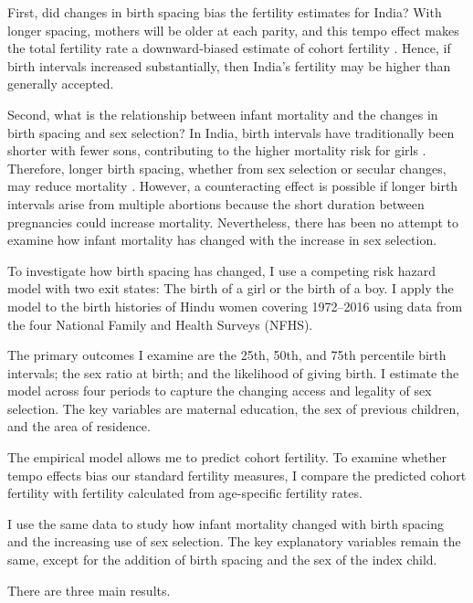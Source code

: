 \documentclass[12pt,letterpaper]{article}
\begin{document}
First, did changes in birth spacing bias the fertility estimates for India? 
With longer spacing, mothers will be older at each parity, and this tempo effect makes the 
total fertility rate a downward-biased estimate of cohort fertility
\citep{Hotz1997,Bongaarts1999,Ni-Bhrolchain2011}. 
Hence, if birth intervals increased substantially, then India's fertility may be higher 
than generally accepted.

Second, what is the relationship between infant mortality and the changes in birth spacing 
and sex selection?
In India, birth intervals have traditionally been shorter with fewer sons, contributing 
to the higher mortality risk for girls
\citep{Whitworth2002,Bhalotra2008,Maitra2008,Jayachandran2011,Jayachandran2017a}.
Therefore, longer birth spacing, whether from sex selection or secular changes, may reduce 
mortality \citep{Conde-Agudelo2012,Molitoris2019}.
However, a counteracting effect is possible if longer birth intervals arise from multiple 
abortions because the short duration between pregnancies could increase mortality. 
Nevertheless, there has been no attempt to examine how infant mortality has changed with 
the increase in sex selection.


To investigate how birth spacing has changed, I use a competing risk hazard model with 
two exit states: The birth of a girl or the birth of a boy. 
I apply the model to the birth histories of Hindu women covering 1972--2016 using 
data from the four National Family and Health Surveys (NFHS). 

The primary outcomes I examine are the 25th, 50th, and 75th percentile birth intervals;
the sex ratio at birth; and the likelihood of giving birth. 
I estimate the model across four periods to capture the changing access and 
legality of sex selection. 
The key variables are maternal education, the sex of previous children, and the area of 
residence.

The empirical model allows me to predict cohort fertility. 
To examine whether tempo effects bias our standard fertility measures, I compare 
the predicted cohort fertility with fertility calculated from age-specific fertility 
rates.

I use the same data to study how infant mortality changed with birth spacing and 
the increasing use of sex selection. 
The key explanatory variables remain the same, except for the addition of birth spacing 
and the sex of the index child. 

There are three main results.
\end{document}
